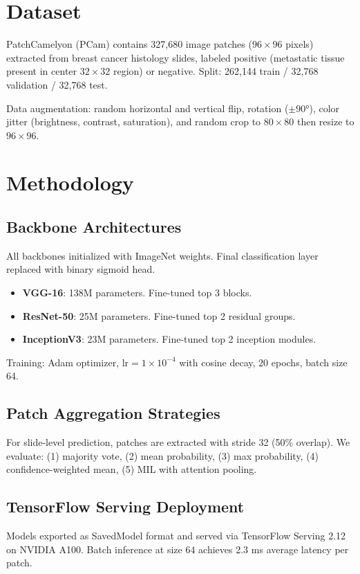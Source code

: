 \documentclass[conference]{IEEEtran}
\begin{document}
\section{Dataset}

PatchCamelyon (PCam) \cite{veeling2018rotation} contains 327,680 image patches ($96 \times 96$ pixels) extracted from breast cancer histology slides, labeled positive (metastatic tissue present in center $32 \times 32$ region) or negative. Split: 262,144 train / 32,768 validation / 32,768 test.

Data augmentation: random horizontal and vertical flip, rotation ($\pm 90°$), color jitter (brightness, contrast, saturation), and random crop to $80 \times 80$ then resize to $96 \times 96$.

\section{Methodology}

\subsection{Backbone Architectures}
All backbones initialized with ImageNet weights. Final classification layer replaced with binary sigmoid head.
\begin{itemize}
\item \textbf{VGG-16}: 138M parameters. Fine-tuned top 3 blocks.
\item \textbf{ResNet-50}: 25M parameters. Fine-tuned top 2 residual groups.
\item \textbf{InceptionV3}: 23M parameters. Fine-tuned top 2 inception modules.
\end{itemize}

Training: Adam optimizer, $\text{lr}=1 \times 10^{-4}$ with cosine decay, 20 epochs, batch size 64.

\subsection{Patch Aggregation Strategies}
For slide-level prediction, patches are extracted with stride 32 (50\% overlap). We evaluate: (1) majority vote, (2) mean probability, (3) max probability, (4) confidence-weighted mean, (5) MIL with attention pooling.

\subsection{TensorFlow Serving Deployment}
Models exported as SavedModel format and served via TensorFlow Serving 2.12 on NVIDIA A100. Batch inference at size 64 achieves 2.3 ms average latency per patch.
\end{document}
